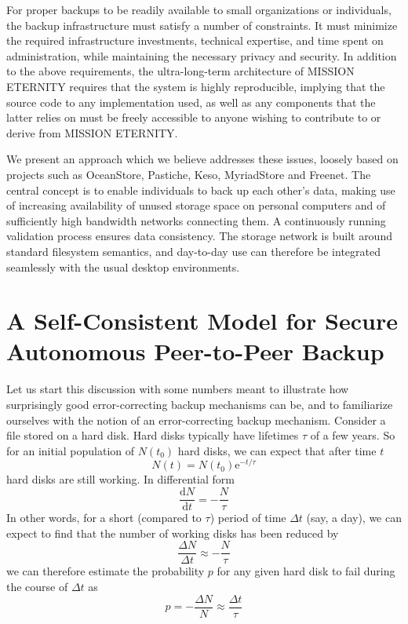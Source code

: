 \documentclass[11pt]{article}
\begin{document}
\begin{mainmatter}
For proper backups to be readily available to small organizations or individuals, the backup infrastructure must satisfy a number of constraints. It must minimize the required infrastructure investments, technical expertise, and time spent on administration, while maintaining the necessary privacy and security. In addition to the above requirements, the ultra-long-term architecture of MISSION ETERNITY requires that the system is highly reproducible, implying that the source code to any implementation used, as well  as any components that the latter relies on must be freely accessible to anyone wishing to contribute to or derive from MISSION ETERNITY.

We present an approach which we believe addresses these issues, loosely based on projects such as OceanStore\cite{oceanstore}, Pastiche\cite{pastiche}, Keso\cite{keso}, MyriadStore\cite{mstore} and Freenet\cite{freenet}. The central concept is to enable individuals to back up each other's data, making use of increasing availability of unused storage space on personal computers and of sufficiently high bandwidth networks  connecting them. A continuously running validation process ensures data consistency. The storage network is built around standard filesystem semantics, and day-to-day use can therefore be integrated seamlessly with the usual desktop environments. 

\section{A Self-Consistent Model for Secure Autonomous Peer-to-Peer Backup}
\label{backup}

Let us start this discussion with some numbers meant to illustrate how surprisingly good error-correcting backup mechanisms can be, and to familiarize ourselves with the notion of an error-correcting backup mechanism. Consider a file stored on a hard disk. Hard disks typically have lifetimes $\tau$ of a few years. So for an initial population of $N(t_0)$ hard disks, we can expect that after time $t$
\begin{equation}
N(t) = N(t_0) \mathrm e^{-t / \tau}
\end{equation}
hard disks are still working. In differential form
\begin{equation}
\frac{\mathrm d N}{\mathrm d t} = -\frac{N}{\tau}
\end{equation}
In other words, for a short (compared to $\tau$) period of time $\Delta t$ (say, a day), we can expect to find that the number of working disks has been reduced by
\begin{equation}
\frac{\Delta N}{\Delta t} \approx -\frac{N}{\tau}
\end{equation}
we can therefore estimate the probability $p$ for any given hard disk to fail during the course of $\Delta t$ as
\begin{equation}
p = -\frac{\Delta N}{N} \approx \frac{\Delta t}{\tau}
\label{destroySmall}
\end{equation}


\end{mainmatter}
\end{document}

